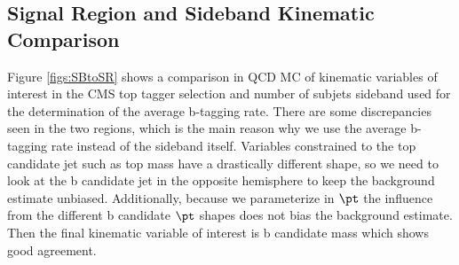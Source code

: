 




\subsection{Signal Region and Sideband Kinematic Comparison}
\label{sec:SBvsSR}
Figure \ref{figs:SBtoSR} shows a comparison in QCD MC of kinematic variables of interest in the CMS top tagger selection and number of subjets sideband used for the determination of the average b-tagging rate.  There are some discrepancies 
seen in the two regions, which is the main reason why we use the average b-tagging rate instead of the sideband itself.  Variables constrained to the top candidate jet such as top mass have a drastically different shape, so we need to look at the 
b candidate jet in the opposite hemisphere to keep the background estimate unbiased.  Additionally, because we parameterize in $\pt$ the influence from the different b candidate $\pt$ shapes does not bias the background estimate.  Then the final 
kinematic variable of interest is b candidate mass which shows good agreement.  


